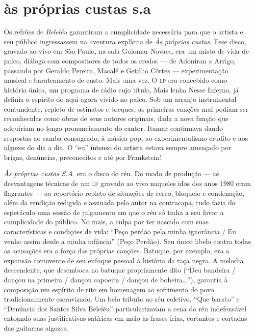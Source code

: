 \section{às próprias custas s.a}

Os refrões de \textit{Beleléu} garantiram a cumplicidade necessária para que o
artista e seu público ingressassem na aventura explícita de \textit{Às próprias
custas}. Esse disco, gravado ao vivo em São Paulo, na sala Guiomar
Novaes, era um misto de vida de palco, diálogo com compositores de todos
os credos --- de Adoniran a Arrigo, passando por Geraldo Pereira, Macalé e
Getúlio Côrtes --- experimentação musical e barateamento de custo. Mais
uma vez, O \textsc{lp} era concebido como história única, um programa de rádio
cujo título, Mais lenha Nesse Inferno, já definia o espírito do
aqui-agora vivido no palco. Sob um arranjo instrumental contundente,
repleto de ostinatos e breques, as primeiras canções mal podiam ser
reconhecidas como obras de seus autores originais, dada a nova função
que adquiriam no longo pronunciamento do cantor. Itamar continuava
dando respostas ao samba consagrado, à música pop, ao experimentalismo
erudito e aos algozes do dia a dia. O ``eu'' intenso do artista estava
sempre ameaçado por brigas, denúncias, preconceitos e até por
Frankstein!

\textit{Às próprias custas \textsc{S.A.}} era o disco do réu. Do modo de produção --- as
desvantagens técnicas de um \textsc{lp} gravado ao vivo naqueles idos dos anos
1980 eram flagrantes --- ao repertório repleto de situações de cerco,
bloqueio e condenação, além da rendição redigida e assinada pelo autor
na contracapa, tudo fazia do espetáculo uma sessão de julgamento em que
o réu só tinha a seu favor a cumplicidade do público. No mais, a culpa
por ter nascido com suas características e condições de vida: ``Peço
perdão pela minha ignorância / Eu venho assim desde a minha infância''
(Peço Perdão). Seu único libelo contra todas as acusações era a força
das próprias canções. Batuque, por exemplo, era a expansão comovente de
seu enfoque pessoal à história da raça negra. A melodia descendente, que
desemboca no batuque propriamente dito (``Deu bandeira / dançou na
primeira / dançou capoeira / dançou de bobeira\ldots''), garantia à
composição um espírito de rito em homenagem ao sofrimento do povo
tradicionalmente escravizado. Um belo tributo ao réu coletivo. ``Que
barato'' e ``Denúncia dos Santos Silva Beleléu'' particularizavam a cena do
réu indefensável entoando suas justificativas satíricas em meio às
frases frias, cortantes e cortadas das guitarras algozes.

